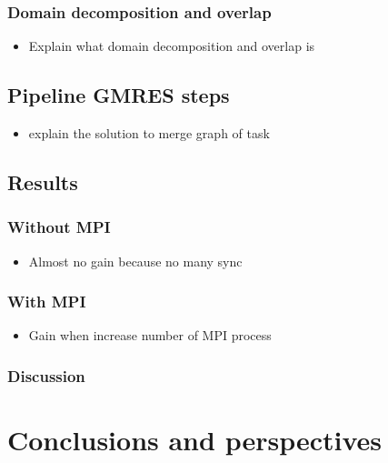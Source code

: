 \documentclass[oneside,12t]{classes/Thesis}
\begin{document}
\subsection{Domain decomposition and overlap}
  \begin{itemize}
    \item Explain what domain decomposition and overlap is
  \end{itemize}


\section{Pipeline GMRES steps}
  \begin{itemize}
    \item explain the solution to merge graph of task
  \end{itemize}


\section{Results}
\subsection{Without MPI}
  \begin{itemize}
    \item Almost no gain because no many sync
  \end{itemize}
\subsection{With MPI}
  \begin{itemize}
    \item Gain when increase number of MPI process
  \end{itemize}
\subsection{Discussion}




\chapter{Conclusions and perspectives}
\minitoc
\vspace{1cm}
\end{document}

